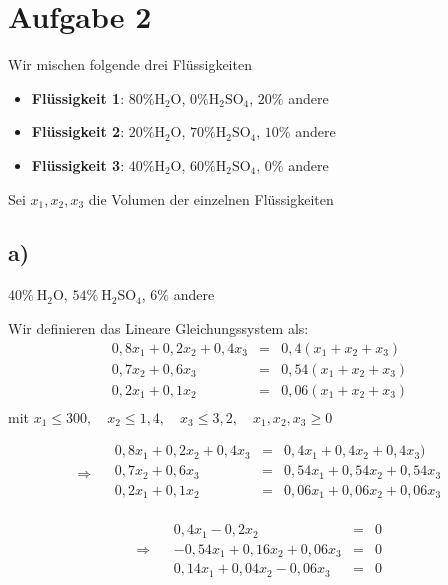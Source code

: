 \section{Aufgabe 2}

Wir mischen folgende drei Flüssigkeiten
\begin{itemize}    \item \textbf{Flüssigkeit 1}: \( 80\% \text{H}_2\text{O} \), \( 0\% \text{H}_2\text{SO}_4 \), \( 20\% \) andere
    \item \textbf{Flüssigkeit 2}: \( 20\% \text{H}_2\text{O} \), \( 70\% \text{H}_2\text{SO}_4 \), \( 10\% \) andere
    \item \textbf{Flüssigkeit 3}: \( 40\% \text{H}_2\text{O} \), \( 60\% \text{H}_2\text{SO}_4 \), \( 0\% \) andere
\end{itemize}

Sei \( x_1, x_2, x_3 \) die Volumen der einzelnen Flüssigkeiten

\subsection{a)}
\( 40\% \ \text{H}_2\text{O} \), \( 54\% \ \text{H}_2\text{SO}_4 \), \( 6\% \) andere

Wir definieren das Lineare Gleichungssystem als:
$$
\begin{aligned}
    0,8x_1 + 0,2x_2 + 0,4x_3 & = & 0,4(x_1 + x_2 + x_3) \\
    0,7x_2 + 0,6x_3 & = & 0,54(x_1 + x_2 + x_3) \\
    0,2x_1 + 0,1x_2 & = & 0,06(x_1 + x_2 + x_3) \\
\end{aligned} $$
mit $x_1 \leq 300, \quad x_2 \leq 1,4, \quad x_3 \leq 3,2, \quad x_1, x_2, x_3 \geq 0$


$$
\Rightarrow \quad
\begin{aligned}
    0,8x_1 + 0,2x_2 + 0,4x_3 & = & 0,4x_1 + 0,4x_2 + 0,4x_3) \\
    0,7x_2 + 0,6x_3 & = & 0,54x_1 + 0,54x_2 + 0,54x_3 \\
    0,2x_1 + 0,1x_2 & = & 0,06x_1 + 0,06x_2 + 0,06x_3 \\  
\end{aligned}
$$

$$
\Rightarrow \quad
\begin{aligned}
    0,4x_1-0,2x_2 & = & 0 \\
    -0,54x_1+0,16x_2+0,06x_3 & = & 0 \\
    0,14x_1+0,04x_2-0,06x_3 & = & 0
\end{aligned}
$$


